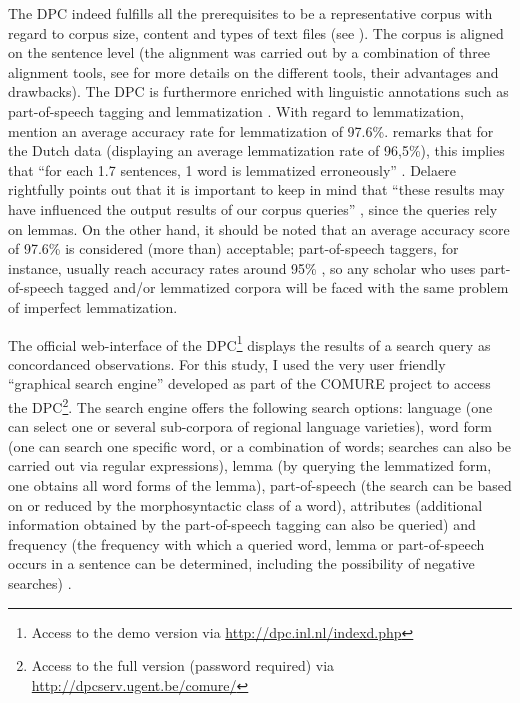 The DPC indeed fulfills all the prerequisites to be a representative corpus with regard to corpus size, content and types of text files (see ). The corpus is aligned on the sentence level (the alignment was carried out by a combination of three alignment tools, see \citealt[190--191]{spyns_dutch_2013} for more details on the different tools, their advantages and drawbacks). The DPC is furthermore enriched with linguistic annotations such as part-of-speech tagging and lemmatization \citep[191]{spyns_dutch_2013}. With regard to lemmatization, \citet[384]{macken_dutch_2011} mention an average accuracy rate for lemmatization of 97.6\%. \citet[50]{delaere_translations_2015} remarks that for the Dutch data (displaying an average lemmatization rate of 96,5\%), this implies that “for each 1.7 sentences, 1 word is lemmatized erroneously” \citep[50]{delaere_translations_2015}. Delaere rightfully points out that it is important to keep in mind that “these results may have influenced the output results of our corpus queries” \citep[50]{delaere_translations_2015}, since the queries rely on lemmas. On the other hand, it should be noted that an average accuracy score of 97.6\% is considered (more than) acceptable; part-of-speech taggers, for instance, usually reach accuracy rates around 95\% \citep[383]{macken_dutch_2011}, so any scholar who uses part-of-speech tagged and\slash or lemmatized corpora will be faced with the same problem of imperfect lemmatization.

The official web-interface of the DPC\footnote{Access to the demo version via \url{http://dpc.inl.nl/indexd.php}} displays the results of a search query as concordanced observations. For this study, I used the very user friendly “graphical search engine” developed as part of the COMURE project to access the DPC\footnote{Access to the full version (password required) via \url{http://dpcserv.ugent.be/comure/}}. The search engine offers the following search options: language (one can select one or several sub-corpora of regional language varieties), word form (one can search one specific word, or a combination of words; searches can also be carried out via regular expressions), lemma (by querying the lemmatized form, one obtains all word forms of the lemma), part-of-speech (the search can be based on or reduced by the morphosyntactic class of a word), attributes (additional information obtained by the part-of-speech tagging can also be queried) and frequency (the frequency with which a queried word, lemma or part-of-speech occurs in a sentence can be determined, including the possibility of negative searches) \citep[62--65]{delaere_translations_2015}.

